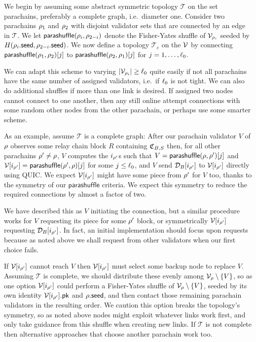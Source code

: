 We begin by assuming some abstract symmetric topology $\mathcal{T}$ on the set parachains, preferably a complete graph, i.e.\ diameter one.  Consider two parachains $\rho_1$ and $\rho_2$ with disjoint validator sets that are connected by an edge in $\mathcal{T}$.  We let $\mathsf{parashuffle}(\rho_i,\rho_{2-i})$ denote the Fisher-Yates shuffle of $\mathcal{V}_{\rho_i}$ seeded by $H( \rho_i.\mathsf{seed}, \rho_{2-i}.\mathsf{seed} )$.  We now define a topology $\mathcal{T}_e$ on the $\mathcal{V}$ by connecting $\mathsf{parashuffle}(\rho_1,\rho_2)[j]$ to $\mathsf{parashuffle}(\rho_2,\rho_1)[j]$ for $j = 1,\ldots,\ell_0$.

We can adapt this scheme to varying $|\mathcal{V}_{\rho_i}| \ge \ell_0$ quite easily if not all parachains have the same number of assigned validators, i.e.\ if $\ell_0$ is not tight.  We can also do additional shuffles if more than one link is desired.  
% 
If assigned two nodes cannot connect to one another, then any still online attempt connections with some random other nodes from the other parachain, or perhaps use some smarter scheme. 

As an example, assume $\mathcal{T}$ is a complete graph:  After our parachain validator $V$ of $\rho$ observes some relay chain block $R$ containing $\mathfrak{C}_{B,S}$ then, for all other parachains $\rho' \ne \rho$, $V$ computes the $i_{\rho'}$s such that $V = \mathsf{parashuffle}(\rho,\rho')[j]$ and $\mathcal{V}[i_{\rho'}] = \mathsf{parashuffle}(\rho',\rho)[j]$ for some $j \leq \ell_0$, and $V$ send $\mathcal{D}_B[i_{\rho'}]$ to $\mathcal{V}[i_{\rho'}]$ directly using QUIC.  We expect $\mathcal{V}[i_{\rho'}]$ might have some piece from $\rho'$ for $V$ too, thanks to the symmetry of our $\mathsf{parashuffle}$ criteria.  We expect this symmetry to reduce the required connections by almost a factor of two.

We have described this as $V$ initiating the connection, but a similar procedure works for $V$ requesting its piece for some $\rho'$ block, or symmetrically $\mathcal{V}[i_{\rho'}]$ requesting $\mathcal{D}_B[i_{\rho'}]$.  In fact, an initial implementation should focus upon requests because as noted above we shall request from other validators when our first choice fails. 

If $\mathcal{V}[i_{\rho'}]$ cannot reach $V$ then $\mathcal{V}[i_{\rho'}]$ must select some backup node to replace $V$.  Assuming $\mathcal{T}$ is complete, we should distribute these evenly among $\mathcal{V}_{\rho} \setminus \{V\}$, so as one option $\mathcal{V}[i_{\rho'}]$ could perform a Fisher-Yates shuffle of $\mathcal{V}_{\rho} \setminus \{V\}$, seeded by its own identity $\mathcal{V}[i_{\rho'}].\mathsf{pk}$ and $\rho.\mathsf{seed}$, and then contact those remaining parachain validators in the resulting order.  We caution this option breaks the topology's symmetry, so as noted above nodes might exploit whatever links work first, and only take guidance from this shuffle when creating new links.  If $\mathcal{T}$ is not complete then alternative approaches that choose another parachain work too.  

